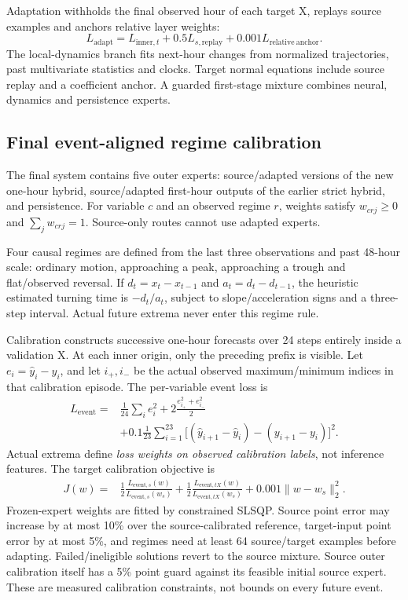 Adaptation withholds the final observed hour of each target X, replays source examples and anchors relative layer weights:
\begin{equation}
L_{\mathrm{adapt}}=L_{\mathrm{inner},t}+0.5L_{s,\mathrm{replay}}+0.001L_{\mathrm{relative\ anchor}}.
\end{equation}
The local-dynamics branch fits next-hour changes from normalized trajectories, past multivariate statistics and clocks. Target normal equations include source replay and a coefficient anchor. A guarded first-stage mixture combines neural, dynamics and persistence experts.

\subsection{Final event-aligned regime calibration}
The final system contains five outer experts: source/adapted versions of the new one-hour hybrid, source/adapted first-hour outputs of the earlier strict hybrid, and persistence. For variable $c$ and an observed regime $r$, weights satisfy $w_{crj}\geq0$ and $\sum_jw_{crj}=1$. Source-only routes cannot use adapted experts.

Four causal regimes are defined from the last three observations and past 48-hour scale: ordinary motion, approaching a peak, approaching a trough and flat/observed reversal. If $d_t=x_t-x_{t-1}$ and $a_t=d_t-d_{t-1}$, the heuristic estimated turning time is $-d_t/a_t$, subject to slope/acceleration signs and a three-step interval. Actual future extrema never enter this regime rule.

Calibration constructs successive one-hour forecasts over 24 steps entirely inside a validation X. At each inner origin, only the preceding prefix is visible. Let $e_i=\widehat y_i-y_i$, and let $i_+,i_-$ be the actual observed maximum/minimum indices in that calibration episode. The per-variable event loss is
\begin{align}
L_{\mathrm{event}}={}&\frac1{24}\sum_i e_i^2+2\frac{e_{i_+}^2+e_{i_-}^2}{2}\nonumber\\
&+0.1\frac1{23}\sum_{i=1}^{23}\big[(\widehat y_{i+1}-\widehat y_i)-(y_{i+1}-y_i)\big]^2.
\end{align}
Actual extrema define \emph{loss weights on observed calibration labels}, not inference features. The target calibration objective is
\begin{align}
J(w)={}&\tfrac12\frac{L_{\mathrm{event},s}(w)}{L_{\mathrm{event},s}(w_s)}+
\tfrac12\frac{L_{\mathrm{event},tX}(w)}{L_{\mathrm{event},tX}(w_s)}+0.001\|w-w_s\|_2^2.
\end{align}
Frozen-expert weights are fitted by constrained SLSQP. Source point error may increase by at most 10\% over the source-calibrated reference, target-input point error by at most 5\%, and regimes need at least 64 source/target examples before adapting. Failed/ineligible solutions revert to the source mixture. Source outer calibration itself has a 5\% point guard against its feasible initial source expert. These are measured calibration constraints, not bounds on every future event.

